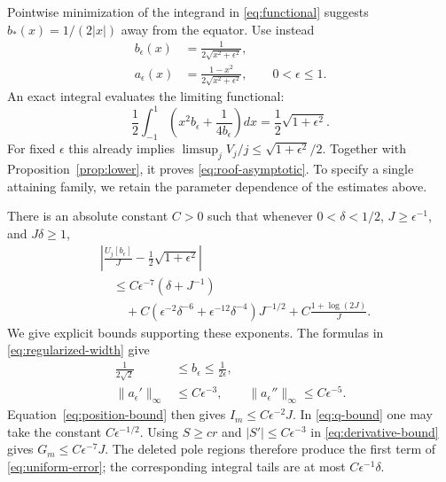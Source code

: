 \documentclass[aps,pra,reprint,superscriptaddress]{revtex4-2}
\theoremstyle{remark}
\newcommand{\norm}[1]{\lVert#1\rVert}
\begin{document}
Pointwise minimization of the integrand in \eqref{eq:functional}
suggests $b_*(x)=1/(2|x|)$ away from the equator. Use instead
\begin{equation}
\begin{aligned}
b_\epsilon(x)&=\frac1{2\sqrt{x^2+\epsilon^2}},\\
a_\epsilon(x)&=\frac{1-x^2}{2\sqrt{x^2+\epsilon^2}},
\qquad 0<\epsilon\leq1.
\end{aligned}
\label{eq:regularized-width}
\end{equation}
An exact integral evaluates the limiting functional:
\begin{equation}
 \frac12\int_{-1}^1\left(x^2b_\epsilon+\frac1{4b_\epsilon}\right)dx
 =\frac12\sqrt{1+\epsilon^2}.
 \label{eq:integral}
\end{equation}
For fixed $\epsilon$ this already implies
$\limsup_jV_j/j\leq\sqrt{1+\epsilon^2}/2$. Together with
Proposition~\ref{prop:lower}, it proves \eqref{eq:roof-asymptotic}.
To specify a single attaining family, we retain the parameter
dependence of the estimates above.

There is an absolute constant $C>0$ such that whenever
$0<\delta<1/2$, $J\geq\epsilon^{-1}$, and $J\delta\geq1$,
\begin{equation}
\begin{aligned}
&\left|\frac{U_j[b_\epsilon]}J-\frac12\sqrt{1+\epsilon^2}\right|\\
&\quad\leq C\epsilon^{-7}(\delta+J^{-1})\\
&\qquad{}+C(\epsilon^{-2}\delta^{-6}
             +\epsilon^{-12}\delta^{-4})J^{-1/2}
       +C\frac{1+\log(2J)}J.
\end{aligned}
\label{eq:uniform-error}
\end{equation}
We give explicit bounds supporting these exponents. The formulas
in \eqref{eq:regularized-width} give
\begin{equation}
\begin{aligned}
\frac1{2\sqrt2}&\leq b_\epsilon\leq\frac1{2\epsilon},\\
\norm{a_\epsilon'}_\infty&\leq C\epsilon^{-3},\qquad
\norm{a_\epsilon''}_\infty\leq C\epsilon^{-5}.
\end{aligned}
\label{eq:parameter-bounds}
\end{equation}
Equation~\eqref{eq:position-bound} then gives
$I_m\leq C\epsilon^{-2}J$. In \eqref{eq:q-bound} one may take the
constant $C\epsilon^{-1/2}$. Using $S\geq cr$ and
$|S'|\leq C\epsilon^{-3}$ in \eqref{eq:derivative-bound} gives
$G_m\leq C\epsilon^{-7}J$. The deleted pole regions therefore
produce the first term of \eqref{eq:uniform-error}; the corresponding
integral tails are at most $C\epsilon^{-1}\delta$.
\end{document}
